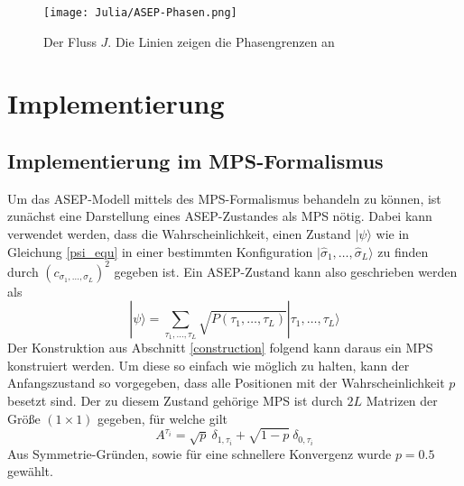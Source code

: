 \documentclass[10pt,a4paper]{report}
\newcommand{\SumIndex}{\sigma_1,\ldots,\sigma_L}
\newcommand{\SumIndexTau}{\tau_1,\ldots,\tau_L}
\begin{document}
\begin{figure}
\begin{center}
\texttt{[image: Julia/ASEP-Phasen.png]}
\caption{Der Fluss $J$. Die Linien zeigen die Phasengrenzen an}
\label{ASEP_flux_analy}
\end{center}
\end{figure}

 

\chapter{Implementierung}
\section{Implementierung im MPS-Formalismus}

Um das ASEP-Modell mittels des MPS-Formalismus behandeln zu können, ist zunächst eine Darstellung eines ASEP-Zustandes als MPS nötig. Dabei kann verwendet werden, dass die Wahrscheinlichkeit, einen Zustand $|\psi\rangle$ wie in Gleichung \ref{psi_equ} in einer bestimmten Konfiguration $|\hat{\sigma}_1,\ldots,\hat{\sigma}_L\rangle$ zu finden durch $(c_{\SumIndex})^2$ gegeben ist. Ein ASEP-Zustand kann also geschrieben werden als
\begin{equation}
|\psi\rangle=\sum_{\SumIndexTau} \sqrt{P(\SumIndexTau)}|\SumIndexTau\rangle
\end{equation}
Der Konstruktion aus Abschnitt \ref{construction} folgend kann daraus ein MPS konstruiert werden. Um diese so einfach wie möglich zu halten, kann der Anfangszustand so vorgegeben, dass alle Positionen mit der Wahrscheinlichkeit $p$ besetzt sind. Der zu diesem Zustand gehörige MPS ist durch $2L$ Matrizen der Größe $(1\times 1)$ gegeben, für welche gilt 
\begin{equation}\label{mean_field_MPS}
A^{\tau_i}=\sqrt{p}\ \delta_{1,\tau_i}+\sqrt{1-p}\ \delta_{0,\tau_i}
\end{equation}
Aus Symmetrie-Gründen, sowie für eine schnellere Konvergenz wurde $p=0.5$ gewählt.
\end{document}
